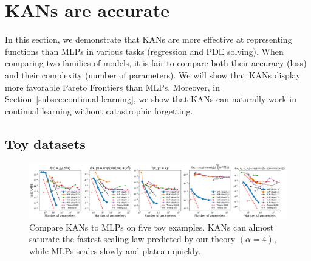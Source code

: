 \documentclass{article}
\numberwithin{equation}{section}
\numberwithin{figure}{section}
\begin{document}
\section{KANs are accurate}\label{sec:kan_accuracy_experiment}


In this section, we demonstrate that KANs are more effective at representing functions than MLPs in various tasks (regression and PDE solving). When comparing two families of models, it is fair to compare both their accuracy (loss) and their complexity (number of parameters). We will show that KANs display more favorable Pareto Frontiers than MLPs. Moreover, in Section~\ref{subsec:continual-learning}, we show that KANs can naturally work in continual learning without catastrophic forgetting.


\subsection{Toy datasets}\label{subsec:acc-toy}

\begin{figure}[t]
    \centering
    \includegraphics[width=1\linewidth]{figs/model_scaling.pdf}
    \caption{Compare KANs to MLPs on five toy examples. KANs can almost saturate the fastest scaling law predicted by our theory $(\alpha=4)$, while MLPs scales slowly and plateau quickly.}
    \label{fig:model_scaling}
\end{figure}
\end{document}
